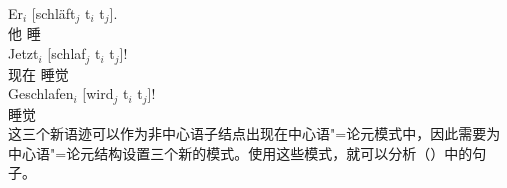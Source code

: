 \eal\settowidth{}
\ex 
\gll Er$_i$    [schläft$_j$ t$_i$ t$_j$].\\
	 他 \spacebr{}睡\\  
\ex 
\gll Jetzt$_i$ [schlaf$_j$ t$_i$ t$_j$]!\\
	 现在 \spacebr{}睡觉\\   
\ex 
\gll Geschlafen$_i$ [wird$_j$ t$_i$ t$_j$]! \\
	 睡觉 \spacebr{}\passiveprs{}\\
\zl
这三个新语迹可以作为非中心语子结点出现在中心语"=论元模式中，因此需要为中心语"=论元结构设置三个新的模式。使用这些模式，就可以分析（）中的句子。


